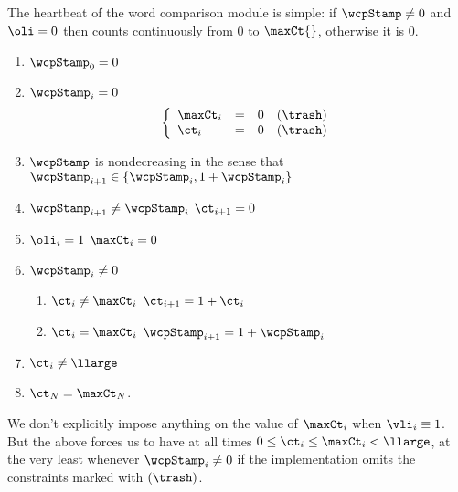 The heartbeat of the word comparison module is simple: if $\wcpStamp \neq 0$ and $\oli = 0$ then \ct{} counts continuously from $0$ to $\maxCt{}$, otherwise it is $0$.
\begin{enumerate}
	\item $\wcpStamp_{0} = 0$
	\item \If $\wcpStamp_{i} = 0$ \Then
		\[
			\left\{ \begin{array}{lcl}
				\maxCt_{i} & = & 0 \quad (\trash) \\
				\ct_{i}    & = & 0 \quad (\trash) \\
			\end{array} \right.
		\]
	\item $\wcpStamp$ is nondecreasing in the sense that $\wcpStamp_{i + 1} \in \{ \wcpStamp_{i}, 1 + \wcpStamp_{i} \}$
	\item \If $\wcpStamp_{i + 1} \neq \wcpStamp_{i}$ \Then $\ct_{i + 1} = 0$
	\item \If $\oli_{i} = 1$ \Then $\maxCt_{i}=0$
	\item \If $\wcpStamp_{i} \neq 0$ \Then
		\begin{enumerate}
			\item \If $\ct_{i} \neq \maxCt_{i}$ \Then $\ct_{i + 1} = 1 + \ct_{i}$
			\item \If $\ct_{i} =    \maxCt_{i}$ \Then $\wcpStamp_{i + 1} = 1 + \wcpStamp_{i}$
		\end{enumerate}
	\item $\ct_{i} \neq \llarge$
	\item $\ct_{N} = \maxCt_{N}$.
\end{enumerate}
\saNote{} We don't explicitly impose anything on the value of $\maxCt_i$ when $\vli_i \equiv 1$.
But the above forces us to have at all times $0 \leq \ct_{i} \leq \maxCt_{i} < \llarge$, at the very least whenever $\wcpStamp_{i} \neq 0$ if the implementation omits the constraints marked with $(\trash)$.
